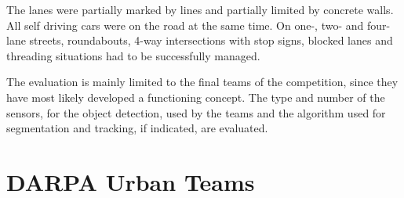 \documentclass[11pt,oneside,openright]{mpreport}
\begin{document}
The lanes were partially marked by lines and partially limited by concrete walls. All self driving cars were on the road at the same time.
On one-, two- and four-lane streets, roundabouts, 4-way intersections with stop signs, blocked lanes and threading situations had to be successfully managed.
 

The evaluation is mainly limited to the final teams of the competition, since they have most likely developed a functioning concept.
The type and number of the sensors, for the object detection, used by the teams and the algorithm used for segmentation and tracking, if indicated, are evaluated.


\section{DARPA Urban Teams}
\end{document}
